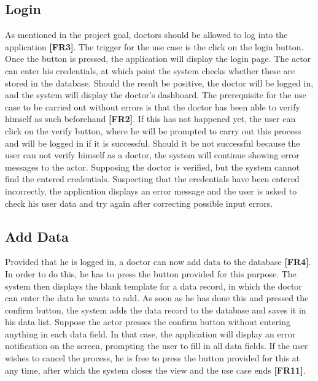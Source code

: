 \subsection{Login}
As mentioned in the project goal, doctors should be allowed to log into the application \textbf{[FR3]}. The trigger for the use case is the click on the login button. Once the button is pressed, the application will display the login page. The actor can enter his credentials, at which point the system checks whether these are stored in the database. Should the result be positive, the doctor will be logged in, and the system will display the doctor's dashboard. The prerequisite for the use case to be carried out without errors is that the doctor has been able to verify himself as such beforehand \textbf{[FR2]}. If this has not happened yet, the user can click on the verify button, where he will be prompted to carry out this process and will be logged in if it is successful. Should it be not successful because the user can not verify himself as a doctor, the system will continue showing error messages to the actor. Supposing the doctor is verified, but the system cannot find the entered credentials. Suspecting that the credentials have been entered incorrectly, the application displays an error message and the user is asked to check his user data and try again after correcting possible input errors.

\subsection{Add Data}
Provided that he is logged in, a doctor can now add data to the database \textbf{[FR4]}. In order to do this, he has to press the button provided for this purpose. The system then displays the blank template for a data record, in which the doctor can enter the data he wants to add. As soon as he has done this and pressed the confirm button, the system adds the data record to the database and saves it in his data list. Suppose the actor presses the confirm button without entering anything in each data field. In that case, the application will display an error notification on the screen, prompting the user to fill in all data fields. If the user wishes to cancel the process, he is free to press the button provided for this at any time, after which the system closes the view and the use case ends \textbf{[FR11]}. 

